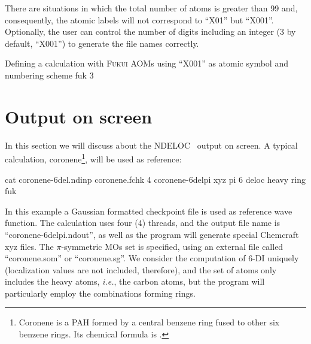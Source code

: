 \documentclass[a4paper,11pt,openany]{memoir}
\newcommand\programa{\textsc{NDELOC}}
\begin{document}
There are situations in which the total number of atoms is greater than 99 and, consequently, the atomic labels will not correspond to ``X01'' but ``X001''. Optionally, the user can control the number of digits including an integer (3 by default, ``X001'') to generate the file names correctly.
\begin{myexample}{Defining a calculation with \textsc{Fukui} \acp{AOM} using ``X001'' as atomic symbol and numbering scheme}
	fuk 3
\end{myexample}

\chapter{Output on screen}\label{chap:screen}
In this section we will discuss about the \programa~ output on screen. A typical calculation, coronene\footnote{Coronene is a \ac{PAH} formed by a central benzene ring fused to other six benzene rings. Its chemical formula is .}, will be used as reference:
\begin{consola}{cat coronene-6del.ndinp}
coronene.fchk 4
coronene-6delpi xyz
pi
6 deloc
heavy ring
fuk
\end{consola}
In this example a Gaussian formatted checkpoint file is used as reference wave function. The calculation uses four (4) threads, and the output file name is ``coronene-6delpi.ndout'', as well as the program will generate special Chemcraft xyz files. The $\pi$-symmetric \acp{MO} set is specified, using an external file called ``coronene.som'' or ``coronene.sg''. We consider the computation of 6-\ac{DI} uniquely (localization values are not included, therefore), and the set of atoms only includes the heavy atoms, \emph{i.e.}, the carbon atoms, but the program will particularly employ the combinations forming rings.
\end{document}
